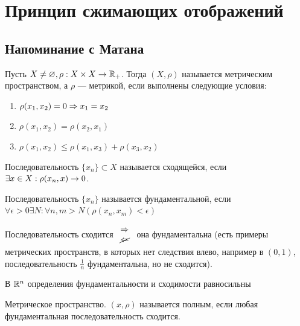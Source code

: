 

\section{Принцип сжимающих отображений}
\subsection{Напоминание с Матана}
\begin{definition}
    Пусть \(X \ne \varnothing, \rho: X \times X \rightarrow \mathbb{R}_+\). Тогда \((X, \rho)\) называется метрическим пространством, а \(\rho\) --- метрикой, если выполнены следующие условия:
    \begin{enumerate}
        \item \(\rho(x_1, x_2) = 0 \Rightarrow x_1 = x_2\)
        \item \(\rho(x_1, x_2) = \rho(x_2, x_1)\)
        \item \(\rho(x_1, x_2) \le \rho(x_1, x_3) + \rho(x_3, x_2)\)
    \end{enumerate}
\end{definition}

\begin{definition}
	Последовательность \(\{x_n\} \subset X\) называется сходящейся, если \(\exists x \in X: \rho(x_n, x) \rightarrow 0\).
\end{definition}

\begin{definition}
	Последовательность \(\{x_n\}\) называется фундаментальной, если \(\forall \epsilon > 0 \exists N: \forall n, m > N (\rho(x_n, x_m) < \epsilon)\)
\end{definition}

\begin{note}
	Последовательность сходится \(\begin{array}{c}
		\Rightarrow \\
		\cancel{\Leftarrow}
	\end{array}\) она фундаментальна (есть примеры метрических пространств, в которых нет следствия влево, например в \((0, 1)\), последовательность \(\frac{1}{n}\) фундаментальна, но не сходится).
\end{note}
\begin{note}
	В \(\mathbb{R}^n\) определения фундаментальности и сходимости равносильны
\end{note}

\begin{definition}
	Метрическое пространство. \((x, \rho)\) называется полным, если любая фундаментальная последовательность сходится.
\end{definition}

